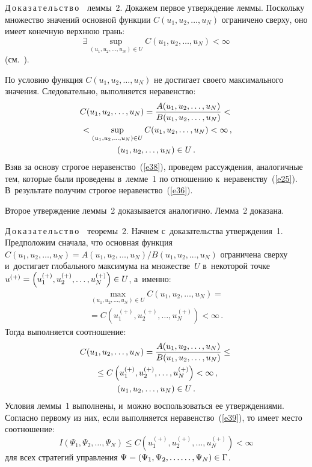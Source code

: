 \begin{multicols}{2}
\noindent
Д\,о\,к\,а\,з\,а\,т\,е\,л\,ь\,с\,т\,в\,о\ \ леммы~2. 
Докажем первое утверждение леммы. Поскольку множество значений 
основной функции $C(u_1, u_2,\ldots, u_N)$ ограничено сверху, оно имеет конечную 
верхнюю грань:
$$
\exists \sup\limits_{(u_1, u_2,\ldots, u_N)\in U} 
C\left(u_1, u_2,\ldots, u_N\right)<\infty
$$
(см.~\cite[гл.~1, \S3, п.~3.4, теорема~1]{25}).

По условию функция $C(u_1, u_2,\ldots, u_N)$ не достигает своего максимального 
значения. Следовательно, выполняется неравенство:
\begin{multline}
C(u_1, u_2,\ldots, u_N)=\displaystyle\frac{\displaystyle A(u_1, u_2,\ldots, u_N)\mathstrut}{\displaystyle B(u_1, u_2,\ldots, u_N)\mathstrut}<{}\\
{}< 
\sup\limits_{(u_1, u_2,\ldots, u_N)\in U} C(u_1, u_2,\ldots, u_N)<\infty\,, 
\\
\left(u_1, u_2,\ldots, u_N\right)\in U\,.
\label{e38}
\end{multline}
Взяв за основу строгое неравенство~(\ref{e38}), проведем рассуждения, аналогичные тем, 
которые были проведены в~лемме~1 по отношению к~неравенству~(\ref{e25}). 
В~результате получим строгое неравенство~(\ref{e36}).

Второе утверждение леммы~2 доказывается аналогично. Лемма~2 доказана.

\noindent
Д\,о\,к\,а\,з\,а\,т\,е\,л\,ь\,с\,т\,в\,о\ 
\ теоремы~2.
Начнем с~доказательства утверждения~1. Предположим сначала, что основная 
функция $C(u_1, u_2,\ldots, u_N)={A(u_1, u_2,\ldots, u_N)}/{B(u_1, u_2,\ldots, u_N)}$ 
ограничена сверху и~достигает глобального максимума на множестве~$U$ 
в~некоторой точке $u^{(+)}\hm=\left(u^{(+)}_1,u^{(+)}_2,\ldots,u^{(+)}_N\right)\hm\in U$,
а~именно:
\begin{multline*}
\max\limits_{(u_1, u_2,\ldots, u_N)\in U} C\left(u_1, u_2,\ldots, u_N\right) = {}\\
{}=
C\left(u^{(+)}_1,u^{(+)}_2,\ldots,u^{(+)}_N\right)<\infty\,.
\end{multline*}
Тогда выполняется соотношение:
\begin{multline}
C(u_1, u_2,\ldots, u_N)=\displaystyle\frac{\displaystyle A(u_1, u_2,\ldots, u_N)\mathstrut}{\displaystyle B(u_1, u_2,\ldots, u_N)\mathstrut}
\leq{}\\
{}\leq C\left(u^{(+)}_1,u^{(+)}_2,\ldots,u^{(+)}_N\right)<\infty\,, 
\\
\left(u_1, u_2,\ldots, u_N\right)\in U\,.
\label{e39}
\end{multline}
Условия леммы~1 выполнены, и~можно воспользоваться ее утверждениями. 
Согласно первому из них, если выполняется неравенство~(\ref{e39}), 
то имеет место соотношение:
\begin{equation*}
I(\Psi_1, \Psi_2,\ldots, \Psi_N)\leq 
C\left(u^{(+)}_1,u^{(+)}_2,\ldots,u^{(+)}_N\right)<\infty 
\end{equation*}
для всех стратегий управления $\Psi\hm=(\Psi_1, \Psi_2,\ldots\linebreak
\ldots, \Psi_N)\hm\in \Gamma$.


\end{multicols}
